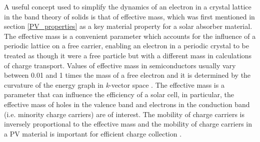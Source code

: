 A useful concept used to simplify the dynamics of an electron in a crystal lattice in the band theory of solids is that of effective mass, which was first mentioned in section \ref{PV_properties} as a key material property for a solar absorber material. The effective mass is a convenient parameter which accounts for the influence of a periodic lattice on a free carrier, enabling an electron in a periodic crystal to be treated as though it were a free particle but with a different mass in calculations of charge transport. Values of effective mass in semiconductors usually vary between 0.01 and 1 times the mass of a free electron and it is determined by the curvature of the energy graph in \textit{k}-vector space \cite{small_semiconductor2}. The effective mass is a parameter that can influence the efficiency of a solar cell, in particular, the effective mass of holes in the valence band and electrons in the conduction band (i.e. minority charge carriers) are of interest. The mobility of charge carriers is inversely proportional to the effective mass and the mobility of charge carriers in a PV material is important for efficient charge collection \cite{transport}.
 
 
 
 


